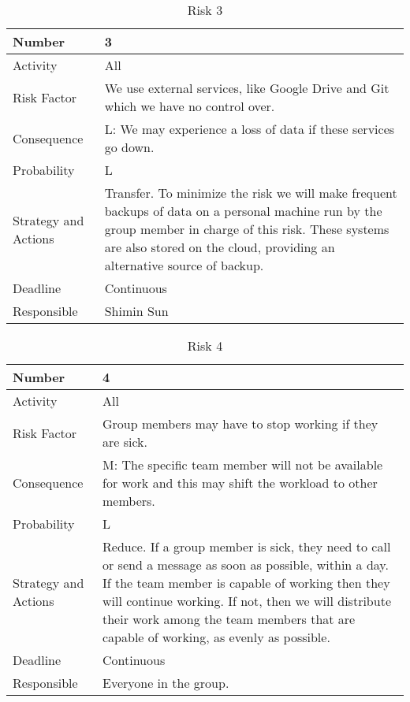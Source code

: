 \documentclass[../document.tex]{subfiles}
\begin{document}
\begin{table}[H]
\caption{Risk 3}
\begin{tabularx}{\textwidth}{|l|X|}
\hline
Number
&3
\\ \hline Activity
&All
\\ \hline Risk Factor
&We use external services, like Google Drive and Git which we have no control over.
\\ \hline Consequence
&L: We may experience a loss of data if these services go down.
\\ \hline Probability
&L
\\ \hline Strategy and Actions
&Transfer. To minimize the risk we will make frequent backups of data on a personal machine run by the group member in charge of this risk. These systems are also stored on the cloud, providing an alternative source of backup.
\\ \hline Deadline
&Continuous
\\ \hline Responsible
&Shimin Sun
\\ \hline 
\end{tabularx}
\end{table}

\begin{table}[H]
\caption{Risk 4}
\begin{tabularx}{\textwidth}{|l|X|}
\hline
Number
&4
\\ \hline Activity
&All
\\ \hline Risk Factor
&Group members may have to stop working if they are sick.
\\ \hline Consequence
&M: The specific team member will not be available for work and this may shift the workload to other members.
\\ \hline Probability
&L
\\ \hline Strategy and Actions
&Reduce. If a group member is sick, they need to call or send a message as soon as possible, within a day. If the team member is capable of working then they will continue working. If not, then we will distribute their work among the team members that are capable of working, as evenly as possible.
\\ \hline Deadline
&Continuous
\\ \hline Responsible
&Everyone in the group.
\\ \hline 
\end{tabularx}
\end{table}
\end{document}
